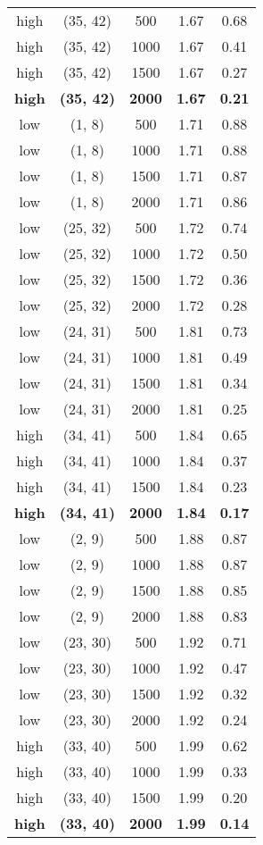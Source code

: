 \begin{tabular}{c c c c c}
high & (35, 42) &  500 & 1.67 & 0.68 \\
high & (35, 42) &  1000 & 1.67 & 0.41 \\
high & (35, 42) &  1500 & 1.67 & 0.27 \\
\textbf{high} & \textbf{(35, 42)} & \textbf{ 2000} & \textbf{1.67} & \textbf{0.21} \\
low & (1, 8) &  500 & 1.71 & 0.88 \\
low & (1, 8) &  1000 & 1.71 & 0.88 \\
low & (1, 8) &  1500 & 1.71 & 0.87 \\
low & (1, 8) &  2000 & 1.71 & 0.86 \\
low & (25, 32) &  500 & 1.72 & 0.74 \\
low & (25, 32) &  1000 & 1.72 & 0.50 \\
low & (25, 32) &  1500 & 1.72 & 0.36 \\
low & (25, 32) &  2000 & 1.72 & 0.28 \\
low & (24, 31) &  500 & 1.81 & 0.73 \\
low & (24, 31) &  1000 & 1.81 & 0.49 \\
low & (24, 31) &  1500 & 1.81 & 0.34 \\
low & (24, 31) &  2000 & 1.81 & 0.25 \\
high & (34, 41) &  500 & 1.84 & 0.65 \\
high & (34, 41) &  1000 & 1.84 & 0.37 \\
high & (34, 41) &  1500 & 1.84 & 0.23 \\
\textbf{high} & \textbf{(34, 41)} & \textbf{ 2000} & \textbf{1.84} & \textbf{0.17} \\
low & (2, 9) &  500 & 1.88 & 0.87 \\
low & (2, 9) &  1000 & 1.88 & 0.87 \\
low & (2, 9) &  1500 & 1.88 & 0.85 \\
low & (2, 9) &  2000 & 1.88 & 0.83 \\
low & (23, 30) &  500 & 1.92 & 0.71 \\
low & (23, 30) &  1000 & 1.92 & 0.47 \\
low & (23, 30) &  1500 & 1.92 & 0.32 \\
low & (23, 30) &  2000 & 1.92 & 0.24 \\
high & (33, 40) &  500 & 1.99 & 0.62 \\
high & (33, 40) &  1000 & 1.99 & 0.33 \\
high & (33, 40) &  1500 & 1.99 & 0.20 \\
\textbf{high} & \textbf{(33, 40)} & \textbf{ 2000} & \textbf{1.99} & \textbf{0.14} \\

\end{tabular}
